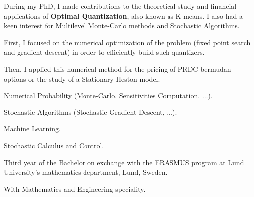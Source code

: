 \documentclass[]{deedy-resume-openfont}
\begin{document}
\vspace{0.2cm}
During my PhD, I made contributions to the theoretical study and financial applications of \textbf{Optimal Quantization}, also known as K-means. I also had a keen interest for Multilevel Monte-Carlo methods and Stochastic Algorithms.
\vspace{0.1cm}
\begin{tightemize}
	\item[\diamond] First, I focused on the numerical optimization of the problem (fixed point search and gradient descent) in order to efficiently build such quantizers.
	\item[\diamond] Then, I applied this numerical method for the pricing of PRDC bermudan options or the study of a Stationary Heston model.
\end{tightemize}

\sectionsep
\sectionsep

\vspace{0.1cm}
\begin{tightemize}
	\item[\diamond] Numerical Probability (Monte-Carlo, Sensitivities Computation, $\dots$).
	\item[\diamond] Stochastic Algorithms (Stochastic Gradient Descent, $\dots$).
	\item[\diamond] Machine Learning.
	\item[\diamond] Stochastic Calculus and Control.
\end{tightemize}

\sectionsep
\sectionsep

Third year of the Bachelor on exchange with the ERASMUS program at Lund University's mathematics department, Lund, Sweden.

\sectionsep
\sectionsep

With Mathematics and Engineering speciality.



\end{document}
